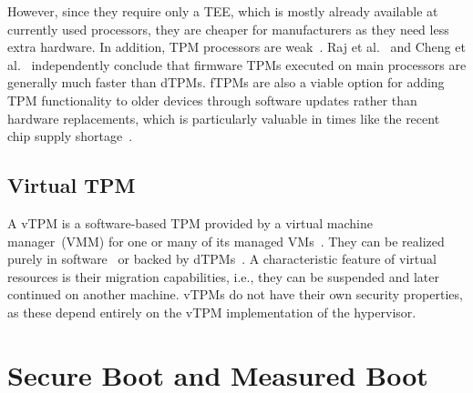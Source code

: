 
However, since they require only a \ac{TEE}, which is mostly already available at currently used processors, they are cheaper for manufacturers as they need less extra hardware.
In addition, TPM processors are weak~\cite{Goh2013, Raj2015}.
Raj et al.~\cite{Raj2015} and Cheng et al.~\cite{Cheng2020} independently conclude that firmware TPMs executed on main processors are generally much faster than \acp{dTPM}.
\Acp{fTPM} are also a viable option for adding \ac{TPM} functionality to older devices through software updates rather than hardware replacements, which is particularly valuable in times like the recent chip supply shortage~\cite{Voas2021, casper2021}.




\subsection{Virtual TPM}

A vTPM is a software-based TPM provided by a virtual machine manager~(VMM) for one or many of its managed VMs~\cite{268868}.
They can be realized purely in software~\cite{268868} or backed by dTPMs~\cite{Liu2010}.
A characteristic feature of virtual resources is their migration capabilities, i.e., they can be suspended and later continued on another machine.
vTPMs do not have their own security properties, as these depend entirely on the vTPM implementation of the hypervisor.


\section{Secure Boot and Measured Boot}

